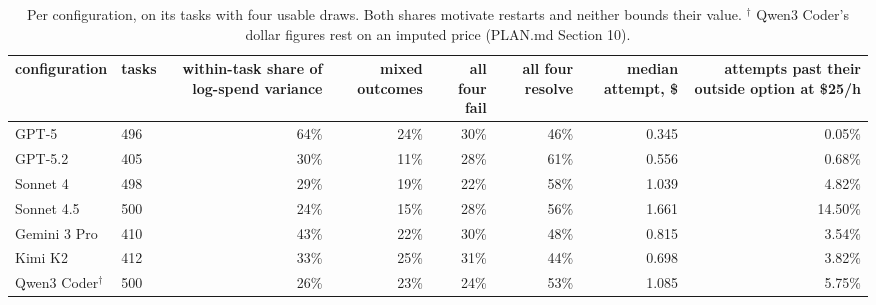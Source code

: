\begin{table}[t]
\centering
\small
\caption{Per configuration, on its tasks with four usable draws. Both shares motivate restarts and neither bounds their value. $^\dagger$ Qwen3 Coder's dollar figures rest on an imputed price (PLAN.md Section 10).}
\label{tab:tableA9_diagnostics}
\begin{tabular}{llrrrrrr}
\toprule
configuration & tasks & within-task share of log-spend variance & mixed outcomes & all four fail & all four resolve & median attempt, \$ & attempts past their outside option at \$25/h \\
\midrule
GPT-5 & 496 & 64\% & 24\% & 30\% & 46\% & 0.345 & 0.05\% \\
\midrule
GPT-5.2 & 405 & 30\% & 11\% & 28\% & 61\% & 0.556 & 0.68\% \\
\midrule
Sonnet 4 & 498 & 29\% & 19\% & 22\% & 58\% & 1.039 & 4.82\% \\
\midrule
Sonnet 4.5 & 500 & 24\% & 15\% & 28\% & 56\% & 1.661 & 14.50\% \\
\midrule
Gemini 3 Pro & 410 & 43\% & 22\% & 30\% & 48\% & 0.815 & 3.54\% \\
\midrule
Kimi K2 & 412 & 33\% & 25\% & 31\% & 44\% & 0.698 & 3.82\% \\
\midrule
Qwen3 Coder$^\dagger$ & 500 & 26\% & 23\% & 24\% & 53\% & 1.085 & 5.75\% \\
\bottomrule
\end{tabular}
\end{table}
